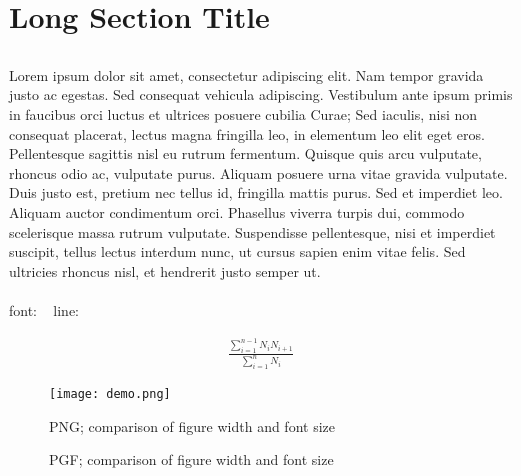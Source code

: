 	\section[Short Section Title]{Long Section Title}
		\begin{multicols}{2}
		\subsection{}
			\paragraph{}
				Lorem ipsum dolor sit amet, consectetur adipiscing elit. Nam tempor gravida justo ac egestas. Sed consequat vehicula adipiscing. Vestibulum ante ipsum primis in faucibus orci luctus et ultrices posuere cubilia Curae; Sed iaculis, nisi non consequat placerat, lectus magna fringilla leo, in elementum leo elit eget eros. Pellentesque sagittis nisl eu rutrum fermentum. Quisque quis arcu vulputate, rhoncus odio ac, vulputate purus. Aliquam posuere urna vitae gravida vulputate. Duis justo est, pretium nec tellus id, fringilla mattis purus. Sed et imperdiet leo. Aliquam auctor condimentum orci. Phasellus viverra turpis dui, commodo scelerisque massa rutrum vulputate. Suspendisse pellentesque, nisi et imperdiet suscipit, tellus lectus interdum nunc, ut cursus sapien enim vitae felis. Sed ultricies rhoncus nisl, et hendrerit justo semper ut.
			\paragraph{}
				font: \fontname\font\ \the\fontdimen6\font
				line: \prntlen{\textwidth} \prntlen{\linewidth}
		\end{multicols}
		
		\begin{equation} \begin{split}
			\frac{\sum_{i=1}^{n-1}N_{i}N_{i+1}}{\sum_{i=1}^{n} N_{i}}
			\label{eq:equation_label}
		\end{split} \end{equation}
		
		\begin{figure}[ht]
			\texttt{[image: demo.png]}
			\caption{PNG; comparison of figure width and font size}
			\label{fig:png_label}
		\end{figure}
		
		\begin{figure}[ht]
			
			\caption{PGF; comparison of figure width and font size}
			\label{fig:pgf_label}
		\end{figure}
		



